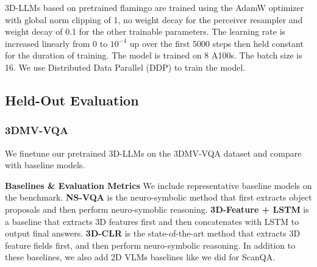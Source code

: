 3D-LLMs based on pretrained flamingo are trained using the AdamW optimizer with global norm
clipping of 1, no weight decay for the perceiver resampler and weight decay of 0.1 for the other
trainable parameters. The learning rate is increased linearly from 0 to $10^{-4}$ up over the first 5000 steps
then held constant for the duration of training. The model is trained on 8 A100s. The batch size is 16. We use Distributed Data Parallel (DDP) to train the model.
\subsection{Held-Out Evaluation}
\subsubsection{3DMV-VQA}
We finetune our pretrained 3D-LLMs on the 3DMV-VQA dataset and compare with baseline models.

\textbf{Baselines \& Evaluation Metrics} We include representative baseline models on the benchmark. 
\textbf{NS-VQA} is the neuro-symbolic method that first extracts object proposals and then perform neuro-symoblic reasoning. \textbf{3D-Feature + LSTM} is a baseline that extracts 3D features first and then concatenates with LSTM to output final answers. \textbf{3D-CLR} is the state-of-the-art method that extracts 3D feature fields first, and then perform neuro-symbolic reasoning. In addition to these baselines, we also add 2D VLMs baselines like we did for ScanQA.


